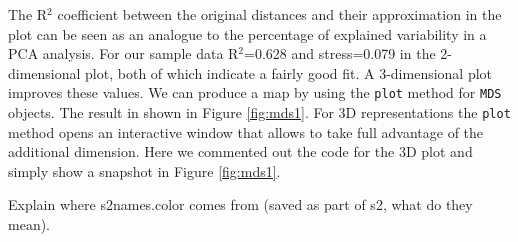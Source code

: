 \documentclass[a4paper,12pt,nogin]{article}
\newcommand{\newtext}[1]{{\color{blue} #1}} %
\newcommand{\drcomment}[1]{{\color{red} #1}} %
\begin{document}
\normalsize
 
The R$^2$ coefficient between the original distances and their approximation in the
plot 
can be seen as an analogue to the percentage of explained variability in a PCA analysis.
For our sample data R$^2$=0.628
\newtext{and stress=0.079 in the 2-dimensional plot, both of which}
indicate a fairly good fit. A 3-dimensional plot improves these
values.
\newtext{We can produce a map by using the \texttt{plot} method for \texttt{MDS} objects.
The result in shown in Figure \ref{fig:mds1}.
For 3D representations the \texttt{plot} method opens an interactive window
that allows to take full advantage of the additional dimension.
Here we commented out the code for the 3D plot and simply show a snapshot in Figure \ref{fig:mds1}.}

\drcomment{Explain where s2names.color comes from (saved as part of s2, what do they mean)}.

\footnotesize
 
\begin{Schunk}
\end{Schunk}

\normalsize
\end{document}
